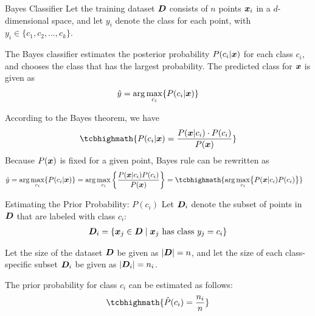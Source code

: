 
\date{Chapter 18: Probabilistic Classification}

\begin{frame}
\titlepage
\end{frame}


\begin{frame}{Bayes Classif\/{i}er}
Let the training dataset ${\boldsymbol D}$ consists of $n$ points ${\boldsymbol x}_i$ in a
$d$-dimensional space, and let $y_i$ denote the class for each
point, with $y_i \in \{c_1,c_2,\ldots,c_k\}$. 

\bigskip
The Bayes classif\/{i}er
 estimates the posterior probability
$P(c_i | {\boldsymbol x})$ for each class $c_i$, and chooses the class that
has the largest probability. The predicted class for ${\boldsymbol x}$ is
given as
\begin{align*}
    \hat{y} = \arg\max_{c_i} \{ P(c_i|{\boldsymbol x}) \}
\end{align*}

According to the Bayes theorem, we have
\begin{align*}
\tcbhighmath{
    P(c_i|\bx) = \frac{P(\bx|c_i) \cdot P(c_i)}{P(\bx)}
}
\end{align*}
Because $P({\boldsymbol x})$ is f\/{i}xed for a given point, Bayes rule 
can be rewritten as
\begin{align*}
    \hy & = \arg\max_{c_i} \{ P(c_i|\bx) \} 
    = \arg\max_{c_i} \lB\{ {P(\bx|c_i)P(c_i) \over P(\bx)}
    \rB\}
     = 
\tcbhighmath{
\arg\max_{c_i} \bigr\{ P(\bx|c_i)P(c_i) \bigl\}
}
\end{align*}
\end{frame}



\begin{frame}{Estimating the Prior Probability: $P(c_i)$}
 Let
${\boldsymbol D}_i$ denote the subset of points in ${\boldsymbol D}$ that are labeled with
class $c_i$:
\begin{align*}
    {\boldsymbol D}_i = \{{\boldsymbol x}_{j} \in {\boldsymbol D} \mid {\boldsymbol x}_{j} \mbox{ has
    class } y_{j}=c_i \}
\end{align*}

\bigskip
Let the size of the dataset ${\boldsymbol D}$ be given as $|{\boldsymbol D}| = n$, and let
the size of each class-specif\/{i}c subset ${\boldsymbol D}_i$ be given as
$|{\boldsymbol D}_i| = n_i$. 

\bigskip
The prior probability for class $c_i$ can be
estimated as follows:
\begin{align*}
\tcbhighmath{
  \hP(c_i) = \frac{n_i}{n}
}
\end{align*}
\end{frame}


